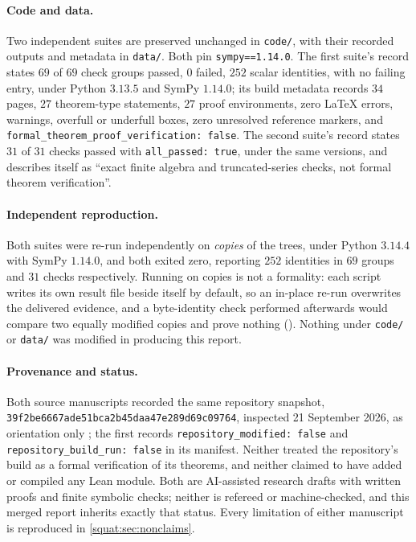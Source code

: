 \documentclass[11pt,letterpaper]{article}
\numberwithin{equation}{section}
\theoremstyle{definition}
\theoremstyle{remark}
\begin{document}
\paragraph{Code and data.} Two independent suites are preserved unchanged in
\texttt{code/}, with their recorded outputs and metadata in \texttt{data/}. Both pin
\texttt{sympy==1.14.0}. The first suite's record states $69$ of $69$ check groups passed,
$0$ failed, $252$ scalar identities, with no failing entry, under Python $3.13.5$ and SymPy
$1.14.0$; its build metadata records $34$ pages, $27$ theorem-type statements, $27$ proof
environments, zero \LaTeX{} errors, warnings, overfull or underfull boxes, zero unresolved
reference markers, and \texttt{formal\_theorem\_proof\_verification: false}. The second
suite's record states $31$ of $31$ checks passed with \texttt{all\_passed: true}, under the
same versions, and describes itself as ``exact finite algebra and truncated-series checks,
not formal theorem verification''.

\paragraph{Independent reproduction.} Both suites were re-run independently on \emph{copies}
of the trees, under Python $3.14.4$ with SymPy $1.14.0$, and both exited zero, reporting
$252$ identities in $69$ groups and $31$ checks respectively. Running on copies is not a
formality: each script writes its own result file beside itself by default, so an in-place
re-run overwrites the delivered evidence, and a byte-identity check performed afterwards
would compare two equally modified copies and prove nothing
(). Nothing under \texttt{code/} or
\texttt{data/} was modified in producing this report.

\paragraph{Provenance and status.} Both source manuscripts recorded the same repository
snapshot, \texttt{39f2be6667ade51bca2b45daa47e289d69c09764}, inspected 21 September 2026,
as orientation only \cite{Repo,RepoDocs,RepoTrig}; the first records
\texttt{repository\_modified: false} and \texttt{repository\_build\_run: false} in its
manifest. Neither treated the repository's build as a formal verification of its theorems,
and neither claimed to have added or compiled any Lean module. Both are AI-assisted
research drafts with written proofs and finite symbolic checks; neither is refereed or
machine-checked, and this merged report inherits exactly that status. Every limitation of
either manuscript is reproduced in \cref{squat:sec:nonclaims}.
\end{document}
